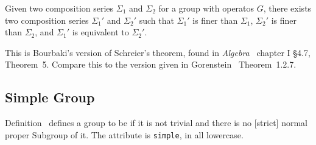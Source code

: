\begin{theorem}
Given two composition series $\Sigma_{1}$ and $\Sigma_{2}$ for a group
with operatos $G$, there exists two composition series $\Sigma_{1}'$ and $\Sigma_{2}'$
such that $\Sigma_{1}'$ is finer than $\Sigma_{1}$, $\Sigma_{2}'$ is
finer than $\Sigma_{2}$, and $\Sigma_{1}'$ is equivalent to $\Sigma_{2}'$.
\end{theorem}

\begin{thm-remark}
This is Bourbaki's version of Schreier's theorem, found in \emph{Algebra}~\cite{bourbaki1974elements}
chapter I \S4{.}7, Theorem~5. Compare this to the version given in
Gorenstein~\cite{gorenstein1980finite} Theorem~1{.}2{.}7.
\end{thm-remark}

\subsection{Simple Group}
Definition~ defines a group to be
if it is not trivial and there is no [strict] normal proper Subgroup of
it. The attribute is
\lstinline{simple}, in all lowercase.
